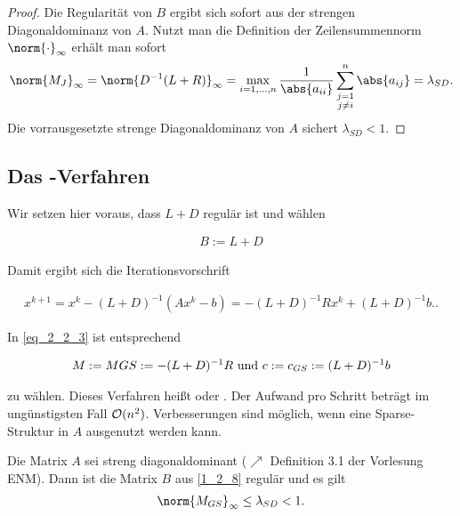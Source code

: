 \begin{proof}
	Die Regularität von $B$ ergibt sich sofort aus der strengen Diagonaldominanz von $A$. Nutzt man die Definition der Zeilensummennorm $\norm{\cdot}_{\infty}$ erhält man sofort
	\begin{align}
		\norm{M_J}_{\infty} = \norm{D^{-1}(L+R)}_{\infty} =\max_{i = 1,\dots,n} \frac{1}{\abs{a_{ii}}} \sum_{\substack{j =1 \\ j\neq i}}^n \abs{a_{ij}}  = \lambda_{SD}.\notag
	\end{align}
	Die vorrausgesetzte strenge Diagonaldominanz von $A$ sichert $\lambda_{SD} < 1$.
\end{proof}

\subsection{Das -Verfahren}
Wir setzen hier voraus, dass $L + D$ regulär ist und wählen

\begin{align}
	B := L + D \label{1_2_8}
\end{align}

Damit ergibt sich die Iterationsvorschrift

\begin{align}
	x^{k+1} = x^k - (L+D)^{-1}(Ax^k - b) = - (L+D)^{-1}R x^k + (L+D)^{-1}b. \label{1_2_9}.
\end{align}

In \cref{eq_2_2_3} ist entsprechend

\begin{align}
	M:= M{GS} := - (L+D)^{-1}R \text{ und } c:= c_{GS} := (L+D)^{-1}b \notag
\end{align}

zu wählen. Dieses Verfahren heißt  oder . Der Aufwand pro Schritt beträgt im ungünstigsten Fall $\operatorname{\mathcal{O}}(n^2)$. Verbesserungen sind möglich, wenn eine Sparse-Struktur in $A$ ausgenutzt werden kann.

\begin{proposition}
	Die Matrix $A$ sei streng diagonaldominant ($\nearrow$ Definition 3.1 der Vorlesung ENM). Dann ist die Matrix $B$ aus \cref{1_2_8} regulär und es gilt
	\begin{align}
		\norm{M_{GS}}_{\infty} \le \lambda_{SD} <1. \notag
	\end{align}
\end{proposition}


